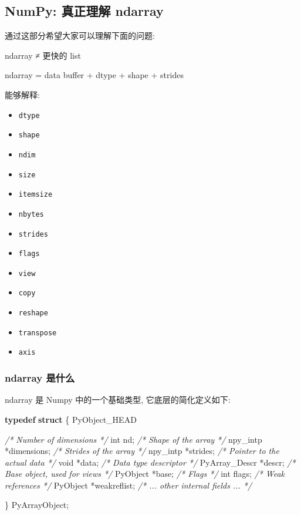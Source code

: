 \documentclass[11pt]{article}
\providecommand{\tightlist}{%
      \setlength{\itemsep}{0pt}\setlength{\parskip}{0pt}}
\newenvironment{Shaded}{}{}
\newcommand{\KeywordTok}[1]{\textcolor[rgb]{0.00,0.44,0.13}{\textbf{{#1}}}}
\newcommand{\DataTypeTok}[1]{\textcolor[rgb]{0.56,0.13,0.00}{{#1}}}
\newcommand{\CommentTok}[1]{\textcolor[rgb]{0.38,0.63,0.69}{\textit{{#1}}}}
\newcommand{\NormalTok}[1]{{#1}}
\newcommand{\OperatorTok}[1]{\textcolor[rgb]{0.40,0.40,0.40}{{#1}}}
\begin{document}
    \subsection{NumPy: 真正理解
ndarray}\label{numpy-ux771fux6b63ux7406ux89e3-ndarray}

    通过这部分希望大家可以理解下面的问题:

ndarray ≠ 更快的 list

ndarray = data buffer + dtype + shape + strides

能够解释:

\begin{itemize}
\tightlist
\item
  \texttt{dtype}
\item
  \texttt{shape}
\item
  \texttt{ndim}
\item
  \texttt{size}
\item
  \texttt{itemsize}
\item
  \texttt{nbytes}
\item
  \texttt{strides}
\item
  \texttt{flags}
\item
  \texttt{view}
\item
  \texttt{copy}
\item
  \texttt{reshape}
\item
  \texttt{transpose}
\item
  \texttt{axis}
\end{itemize}

    \subsubsection{ndarray 是什么}\label{ndarray-ux662fux4ec0ux4e48}

    ndarray 是 Numpy 中的一个基础类型, 它底层的简化定义如下:

\begin{Shaded}
\begin{Highlighting}[]
\KeywordTok{typedef} \KeywordTok{struct} \OperatorTok{\{}
\NormalTok{    PyObject\_HEAD}

    \CommentTok{/* Number of dimensions */}
    \DataTypeTok{int}\NormalTok{ nd}\OperatorTok{;}
    \CommentTok{/* Shape of the array */}
\NormalTok{    npy\_intp }\OperatorTok{*}\NormalTok{dimensions}\OperatorTok{;}
    \CommentTok{/* Strides of the array */}
\NormalTok{    npy\_intp }\OperatorTok{*}\NormalTok{strides}\OperatorTok{;}
    \CommentTok{/* Pointer to the actual data */}
    \DataTypeTok{void} \OperatorTok{*}\NormalTok{data}\OperatorTok{;}
    \CommentTok{/* Data type descriptor */}
\NormalTok{    PyArray\_Descr }\OperatorTok{*}\NormalTok{descr}\OperatorTok{;}
    \CommentTok{/* Base object, used for views */}
\NormalTok{    PyObject }\OperatorTok{*}\NormalTok{base}\OperatorTok{;}
    \CommentTok{/* Flags */}
    \DataTypeTok{int}\NormalTok{ flags}\OperatorTok{;}
    \CommentTok{/* Weak references */}
\NormalTok{    PyObject }\OperatorTok{*}\NormalTok{weakreflist}\OperatorTok{;}
    \CommentTok{/* ... other internal fields ... */}

\OperatorTok{\}}\NormalTok{ PyArrayObject}\OperatorTok{;}
\end{Highlighting}
\end{Shaded}
\end{document}
